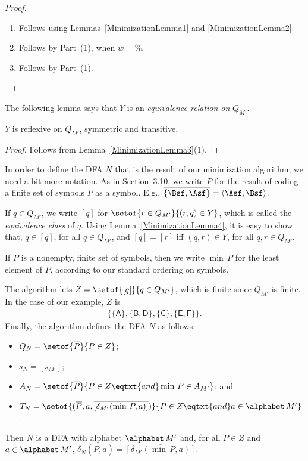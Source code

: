\begin{proof}
\begin{enumerate}[\quad(1)]
\item Follows using Lemmas~\ref{MinimizationLemma1} and
  \ref{MinimizationLemma2}.

\item Follows by Part~(1), when $w=\%$.

\item Follows by Part~(1).
\end{enumerate}
\end{proof}

The following lemma says that $Y$ is an \emph{equivalence relation on}
$Q_{M'}$.

\begin{lemma}
\label{MinimizationLemma4}
$Y$ is reflexive on $Q_{M'}$, symmetric and transitive.
\end{lemma}

\begin{proof}
Follows from Lemma~\ref{MinimizationLemma3}(1).
\end{proof}

In order to define the DFA $N$ that is the result of our minimization
algorithm, we need a bit more notation.  As in Section~3.10, we write
$\overline{P}$ for the result of coding a finite set of symbols $P$ as
a symbol.  E.g., $\overline{\{\Bsf,\Asf\}} = \langle\Asf,\Bsf\rangle$.

If $q\in Q_{M'}$, we write $[q]$ for $\setof{r\in Q_{M'}}{(r,q)\in
  Y}$, which is called the \emph{equivalence class} of $q$.  Using
Lemma~\ref{MinimizationLemma4}, it is easy to show that, $q\in[q]$,
for all $q\in Q_{M'}$, and $[q]=[r]$ iff $(q,r)\in Y$, for all $q,r\in
Q_{M'}$.

If $P$ is a nonempty, finite set of symbols, then we write $\min\,P$
for the least element of $P$, according to our standard ordering on
symbols.

The algorithm lets $Z=\setof{[q]}{q\in Q_{M'}}$, which is finite since
$Q_{M'}$ is finite.
In the case of our example, $Z$ is
\begin{gather*}
\mathsf{\{\{A\}, \{B,D\}, \{C\}, \{E,F\}\}} .
\end{gather*}
Finally, the algorithm defines the DFA $N$ as follows:
\begin{itemize}
\item $Q_N = \setof{\overline{P}}{P\in Z}$;

\item $s_N = \overline{[s_{M'}]}$;

\item $A_N = \setof{\overline{P}}{P\in Z\eqtxt{and}\min\,P\in
 A_{M'}}$; and

\item $T_N = \setof{(\overline{P},a,
{\overline{[\delta_{M'}(\min\,P,a)]}})}%
{P\in Z\eqtxt{and}a\in\alphabet\,M'}$.
\end{itemize}
Then $N$ is a DFA with alphabet $\alphabet\,M'$ and, for all $P\in Z$
and $a\in\alphabet\,M'$, $\delta_N(\overline{P},a)=
\overline{[\delta_{M'}(\min\,P,a)]}$.

